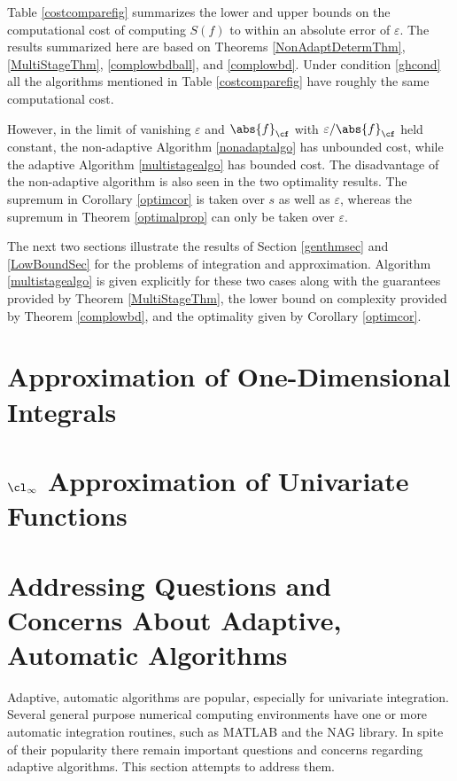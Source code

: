 \documentclass[]{elsarticle}
\theoremstyle{definition}
\theoremstyle{remark}
\newcommand{\Fnorm}[1]{\abs{#1}_{\cf}}
\begin{document}
Table \ref{costcomparefig} summarizes the lower and upper bounds on the computational cost of computing $S(f)$ to within an absolute error of $\varepsilon$.  The results summarized here are based on Theorems \ref{NonAdaptDetermThm}, \ref{MultiStageThm}, \ref{complowbdball}, and \ref{complowbd}.  Under condition \eqref{ghcond} all the algorithms mentioned in Table \ref{costcomparefig} have roughly the same computational cost.  

However, in the limit of vanishing $\varepsilon$ and $\Fnorm{f}$ with $\varepsilon/\Fnorm{f}$ held constant, the non-adaptive Algorithm \ref{nonadaptalgo} has unbounded cost, while the adaptive Algorithm \ref{multistagealgo} has bounded cost. The disadvantage of the non-adaptive algorithm is also seen in the two optimality results.  The supremum in Corollary \ref{optimcor} is taken over $s$ as well as $\varepsilon$, whereas the supremum in Theorem \ref{optimalprop} can only be taken over $\varepsilon$.

The next two sections illustrate the results of Section \ref{genthmsec} and \ref{LowBoundSec} for the problems of integration and approximation. Algorithm \ref{multistagealgo} is given explicitly for these two cases along with the guarantees provided by Theorem \ref{MultiStageThm}, the lower bound on complexity provided by Theorem \ref{complowbd}, and the optimality given by Corollary \ref{optimcor}.

\section{Approximation of One-Dimensional Integrals} \label{integsec}



\section{$\cl_{\infty}$ Approximation of Univariate Functions} \label{approxsec}



\section{Addressing Questions and Concerns About Adaptive, Automatic Algorithms} \label{overcomesec}

Adaptive, automatic algorithms are popular, especially for univariate integration.  Several general purpose numerical computing environments have one or more automatic integration routines, such as MATLAB \cite{TrefEtal12,MAT8.1} and the NAG \cite{NAG23} library.  In spite of their popularity there remain important questions and concerns regarding adaptive algorithms.  This section attempts to address them.
\end{document}

